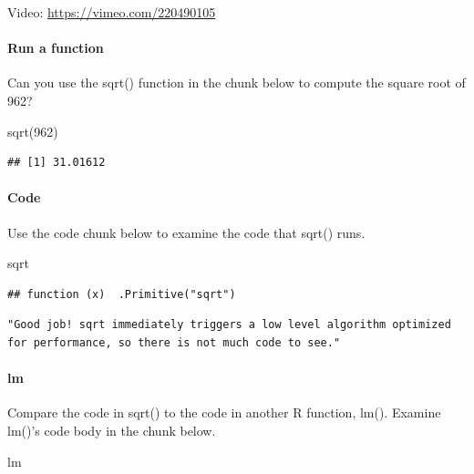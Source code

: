 \documentclass[
]{article}
\newenvironment{Shaded}{\begin{snugshade}}{\end{snugshade}}
\newcommand{\DecValTok}[1]{\textcolor[rgb]{0.00,0.00,0.81}{#1}}
\newcommand{\FunctionTok}[1]{\textcolor[rgb]{0.00,0.00,0.00}{#1}}
\newcommand{\NormalTok}[1]{#1}
\begin{document}
Video: \url{https://vimeo.com/220490105}

\hypertarget{run-a-function}{%
\paragraph{Run a function}\label{run-a-function}}

Can you use the sqrt() function in the chunk below to compute the square
root of 962?

\begin{Shaded}
\begin{Highlighting}[]
\FunctionTok{sqrt}\NormalTok{(}\DecValTok{962}\NormalTok{)}
\end{Highlighting}
\end{Shaded}

\begin{verbatim}
## [1] 31.01612
\end{verbatim}

\hypertarget{code}{%
\paragraph{Code}\label{code}}

Use the code chunk below to examine the code that sqrt() runs.

\begin{Shaded}
\begin{Highlighting}[]
\NormalTok{sqrt}
\end{Highlighting}
\end{Shaded}

\begin{verbatim}
## function (x)  .Primitive("sqrt")
\end{verbatim}

\begin{verbatim}
"Good job! sqrt immediately triggers a low level algorithm optimized for performance, so there is not much code to see."
\end{verbatim}

\hypertarget{lm}{%
\paragraph{lm}\label{lm}}

Compare the code in sqrt() to the code in another R function, lm().
Examine lm()'s code body in the chunk below.

\begin{Shaded}
\begin{Highlighting}[]
\NormalTok{lm}
\end{Highlighting}
\end{Shaded}
\end{document}
